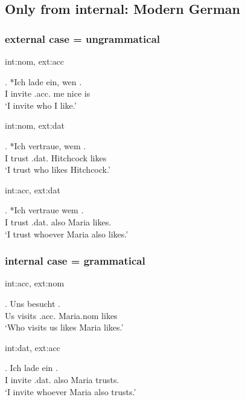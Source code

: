



\subsection{Only from internal: Modern German}

\subsubsection{external case = ungrammatical}

\ac{int}:\ac{nom}, \ac{ext}:\ac{acc}

\exg. *Ich {lade ein}, wen   .\\
 I invite\scsub{[acc]} .\ac{acc}. me nice is\scsub{[nom]}\\
 `I invite who I like.' 

\ac{int}:\ac{nom}, \ac{ext}:\ac{dat}

\exg. *Ich vertraue, wem  .\\
 I trust\scsub{[dat]} .\ac{dat}. Hitchcock likes\scsub{[nom]}\\
 `I trust who likes Hitchcock.' 

\ac{int}:\ac{acc}, \ac{ext}:\ac{dat}

\exg. *Ich vertraue wem   . \\
 I trust\scsub{[dat]} .\ac{dat}. also Maria likes\scsub{[acc]}.\\
 `I trust whoever Maria also likes.' 


\subsubsection{internal case = grammatical}

\ac{int}:\ac{acc}, \ac{ext}:\ac{nom}

\exg. Uns besucht   .\\
 Us visits\scsub{[nom]} .\ac{acc}. Maria.\ac{nom} likes\scsub{[acc]}\\
 `Who visits us likes Maria likes.' 

\ac{int}:\ac{dat}, \ac{ext}:\ac{acc}

\exg. Ich {lade ein}    . \\
 I invite\scsub{[acc]} .\ac{dat}. also Maria trusts\scsub{[dat]}.\\
 `I invite whoever Maria also trusts.' 

